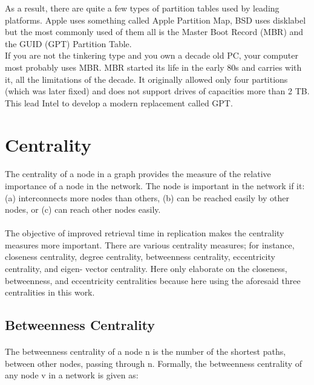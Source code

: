 As a result, there are quite a few types of partition tables used by leading
platforms. Apple uses something called Apple Partition Map, BSD uses disklabel
but the most commonly used of them all is the Master Boot Record (MBR) and the
GUID (GPT) Partition Table.\\

If you are not the tinkering type and you own a decade old PC, your computer
most probably uses MBR. MBR started its life in the early 80s and carries with
it, all the limitations of the decade. It originally allowed only four
partitions (which was later fixed) and does not support drives of capacities
more than 2 TB. This lead Intel to develop a modern replacement called GPT.


\section{Centrality}
\paragraph{}
The centrality of a node in a graph provides the measure of the relative importance
of a node in the network. The node is important in the network if it:
\newline (a) interconnects more nodes than others,
\newline (b) can be reached easily by other nodes, or 
\newline(c) can reach other nodes easily.
\paragraph{}
The objective of improved retrieval time in replication makes the centrality measures
more important. There are various centrality measures; for instance, closeness centrality,
degree centrality, betweenness centrality, eccentricity centrality, and eigen- vector centrality.
Here only elaborate on the closeness, betweenness, and eccentricity centralities because here
using the aforesaid three centralities in this work.
\subsection{Betweenness Centrality} 
\paragraph{}
The betweenness centrality of a node n is the number of the shortest paths, between
other nodes, passing through n. Formally, the betweenness centrality of any node v in a
network is given as:

